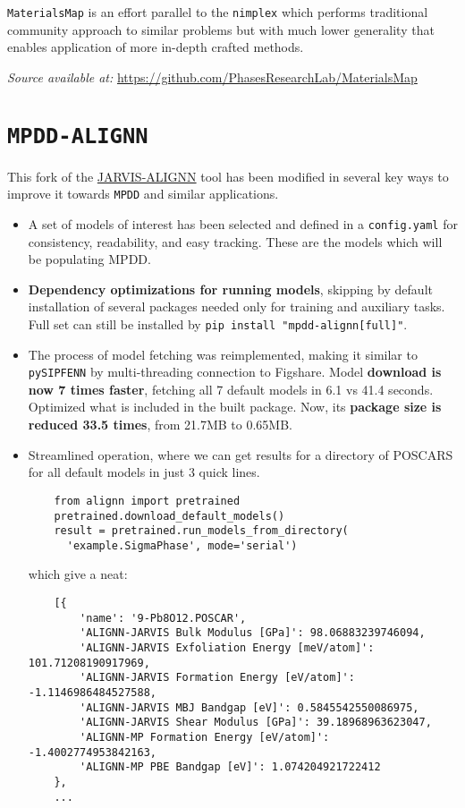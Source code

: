 \texttt{MaterialsMap} is an effort parallel to the \texttt{nimplex} which performs traditional community approach to similar problems but with much lower generality that enables application of more in-depth crafted methods.

\hspace{24pt} 
\textit{Source available at:} 
\href{https://github.com/PhasesResearchLab/MaterialsMap}{https://github.com/PhasesResearchLab/MaterialsMap}



\section{\texttt{MPDD-ALIGNN}} \label{osoft:sec:mpddalignn}

This fork of the \href{https://github.com/usnistgov/alignn}{JARVIS-ALIGNN} tool has been modified in several key ways to improve it towards \texttt{MPDD} and similar applications. 

\begin{itemize}
    \item A set of models of interest has been selected and defined in a \texttt{config.yaml} for consistency, readability, and easy tracking. These are the models which will be populating MPDD.
    \item \textbf{Dependency optimizations for running models}, skipping by default installation of several packages needed only for training and auxiliary tasks. Full set can still be installed by \texttt{pip install "mpdd-alignn[full]"}.
    \item The process of model fetching was reimplemented, making it similar to \texttt{pySIPFENN} by multi-threading connection to Figshare. Model \textbf{download is now 7 times faster}, fetching all 7 default models in 6.1 vs 41.4 seconds. Optimized what is included in the built package. Now, its \textbf{package size is reduced 33.5 times}, from 21.7MB to 0.65MB.
    \item Streamlined operation, where we can get results for a directory of POSCARS for all default models in just 3 quick lines.
    \begin{verbatim}
    from alignn import pretrained
    pretrained.download_default_models()
    result = pretrained.run_models_from_directory(
      'example.SigmaPhase', mode='serial')
    \end{verbatim}
    which give a neat:
    \begin{verbatim}
    [{
        'name': '9-Pb8O12.POSCAR',
        'ALIGNN-JARVIS Bulk Modulus [GPa]': 98.06883239746094,
        'ALIGNN-JARVIS Exfoliation Energy [meV/atom]': 101.71208190917969,
        'ALIGNN-JARVIS Formation Energy [eV/atom]': -1.1146986484527588,
        'ALIGNN-JARVIS MBJ Bandgap [eV]': 0.5845542550086975,
        'ALIGNN-JARVIS Shear Modulus [GPa]': 39.18968963623047,
        'ALIGNN-MP Formation Energy [eV/atom]': -1.4002774953842163,
        'ALIGNN-MP PBE Bandgap [eV]': 1.074204921722412
    },
    ...
    \end{verbatim}
\end{itemize}


